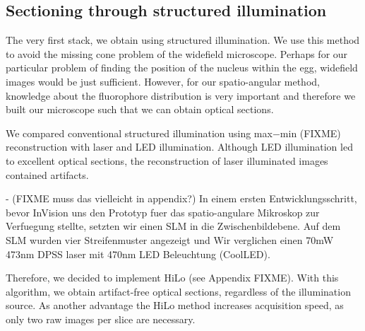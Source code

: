 \subsection{Sectioning through structured illumination}
The very first stack, we obtain using structured illumination.  We use this
method to avoid the missing cone problem of the
widefield microscope. Perhaps for our particular problem of finding
the position of the nucleus within the egg, widefield images would be
just sufficient.  However, for our spatio-angular method, knowledge
about the fluorophore distribution is very important and therefore we
built our microscope such that we can obtain optical sections.

We compared conventional structured illumination using max$-$min
(FIXME) reconstruction with laser and LED illumination. Although LED
illumination led to excellent optical sections, the reconstruction of
laser illuminated images contained artifacts.

{\color{red}
- (FIXME muss das vielleicht in appendix?) In einem ersten
Entwicklungsschritt, bevor InVision uns den Prototyp fuer das
spatio-angulare Mikroskop zur Verfuegung stellte, setzten wir einen
SLM in die Zwischenbildebene. Auf dem SLM wurden vier Streifenmuster
angezeigt und Wir verglichen einen 70mW 473nm DPSS laser mit 470nm LED
Beleuchtung (CoolLED).}

Therefore, we decided to implement HiLo (see Appendix FIXME). With
this algorithm, we obtain artifact-free optical sections, regardless
of the illumination source. As another advantage the HiLo method
increases acquisition speed, as only two raw images per slice are
necessary.


